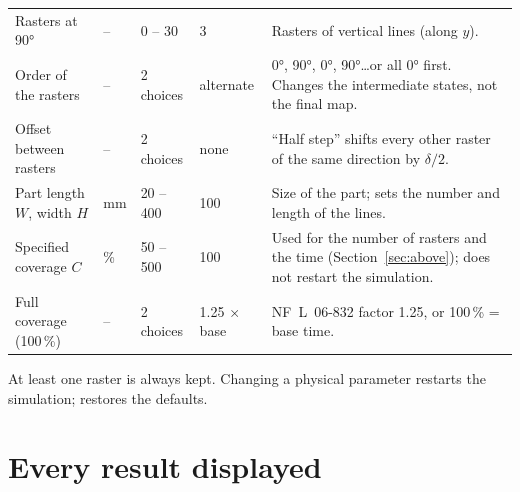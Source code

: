 \documentclass[11pt,a4paper]{article}
\begin{document}
\begin{longtable}{@{}p{3.6cm}p{1.4cm}p{2.0cm}p{1.6cm}p{4.9cm}@{}}
Rasters at 90° & -- & 0 -- 30 & 3 & Rasters of vertical lines (along $y$).\\
Order of the rasters & -- & 2 choices & alternate & 0°, 90°, 0°, 90°\ldots or all 0° first. Changes the intermediate states, not the final map.\\
Offset between rasters & -- & 2 choices & none & ``Half step'' shifts every other raster of the same direction by $\delta/2$.\\
Part length $W$, width $H$ & mm & 20 -- 400 & 100 & Size of the part; sets the number and length of the lines.\\
Specified coverage $C$ & \% & 50 -- 500 & 100 & Used for the number of rasters and the time (Section~\ref{sec:above}); does not restart the simulation.\\
Full coverage (100\,\%) & -- & 2 choices & 1.25 × base & NF~L~06-832 factor 1.25, or 100\,\% = base time.\\
\bottomrule
\end{longtable}
\noindent At least one raster is always kept. Changing a physical parameter restarts the simulation;  restores the defaults.

\section{Every result displayed}\label{sec:reads}
\end{document}

